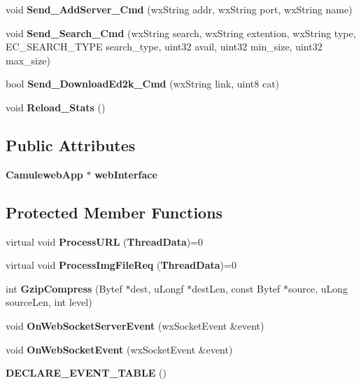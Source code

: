 \begin{DoxyCompactItemize}
\item 
void {\bfseries Send\_\-AddServer\_\-Cmd} (wxString addr, wxString port, wxString name)\label{classCWebServerBase_ad0e6cfc576f600bcc803849289f58630}

\item 
void {\bfseries Send\_\-Search\_\-Cmd} (wxString search, wxString extention, wxString type, EC\_\-SEARCH\_\-TYPE search\_\-type, uint32 avail, uint32 min\_\-size, uint32 max\_\-size)\label{classCWebServerBase_a81fb951eb6e3def9a896cf98e30ddbfd}

\item 
bool {\bfseries Send\_\-DownloadEd2k\_\-Cmd} (wxString link, uint8 cat)\label{classCWebServerBase_a5e8c7a9db7c528bbdaf6e068cc6a1574}

\item 
void {\bfseries Reload\_\-Stats} ()\label{classCWebServerBase_a84e41ef01c6c0d52c4662ee5564c1312}

\end{DoxyCompactItemize}
\subsection*{Public Attributes}
\begin{DoxyCompactItemize}
\item 
{\bf CamulewebApp} $\ast$ {\bfseries webInterface}\label{classCWebServerBase_af14240159e68cc58896a7ff14316f502}

\end{DoxyCompactItemize}
\subsection*{Protected Member Functions}
\begin{DoxyCompactItemize}
\item 
virtual void {\bfseries ProcessURL} ({\bf ThreadData})=0\label{classCWebServerBase_a5ab0d93c349f76d16c2f352fe7a4d636}

\item 
virtual void {\bfseries ProcessImgFileReq} ({\bf ThreadData})=0\label{classCWebServerBase_a2a5c087c405df9662ad61cbf14723a66}

\item 
int {\bfseries GzipCompress} (Bytef $\ast$dest, uLongf $\ast$destLen, const Bytef $\ast$source, uLong sourceLen, int level)\label{classCWebServerBase_ae98c20bf2dcaf40364d10bc08e1fab25}

\item 
void {\bfseries OnWebSocketServerEvent} (wxSocketEvent \&event)\label{classCWebServerBase_ae5d6240aa159ca8f997569eb92c38983}

\item 
void {\bfseries OnWebSocketEvent} (wxSocketEvent \&event)\label{classCWebServerBase_a2f2342becbf00523706da0a5813cbe37}

\item 
{\bfseries DECLARE\_\-EVENT\_\-TABLE} ()\label{classCWebServerBase_a5bfd5a74470bb166174fd0161b30d850}

\end{DoxyCompactItemize}
